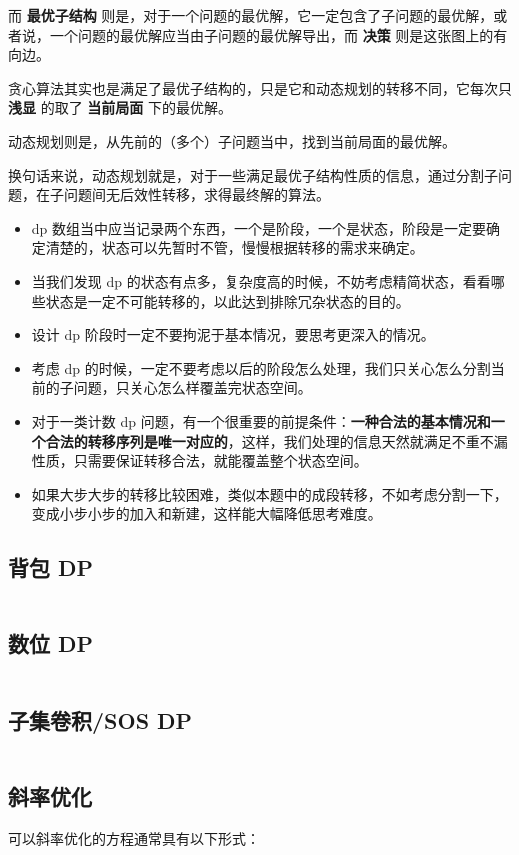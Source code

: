 \documentclass[titlepage, a4paper]{article}
\begin{document}
\begin{multicols}{2}
\begin{spacing}{0.6}
			 		而 \textbf{最优子结构} 则是，对于一个问题的最优解，它一定包含了子问题的最优解，或者说，一个问题的最优解应当由子问题的最优解导出，而 \textbf{决策} 则是这张图上的有向边。
			 		
			 		贪心算法其实也是满足了最优子结构的，只是它和动态规划的转移不同，它每次只 \textbf{浅显} 的取了 \textbf{当前局面} 下的最优解。
			 		
			 		动态规划则是，从先前的（多个）子问题当中，找到当前局面的最优解。
			 		
			 		换句话来说，动态规划就是，对于一些满足最优子结构性质的信息，通过分割子问题，在子问题间无后效性转移，求得最终解的算法。
			 		
			 		\begin{itemize}
			 			\item dp 数组当中应当记录两个东西，一个是阶段，一个是状态，阶段是一定要确定清楚的，状态可以先暂时不管，慢慢根据转移的需求来确定。
			 			\item 当我们发现 dp 的状态有点多，复杂度高的时候，不妨考虑精简状态，看看哪些状态是一定不可能转移的，以此达到排除冗杂状态的目的。
			 			\item 设计 dp 阶段时一定不要拘泥于基本情况，要思考更深入的情况。
			 			\item 考虑 dp 的时候，一定不要考虑以后的阶段怎么处理，我们只关心怎么分割当前的子问题，只关心怎么样覆盖完状态空间。
			 			\item 对于一类计数 dp 问题，有一个很重要的前提条件：\textbf{一种合法的基本情况和一个合法的转移序列是唯一对应的}，这样，我们处理的信息天然就满足不重不漏性质，只需要保证转移合法，就能覆盖整个状态空间。
			 			\item 如果大步大步的转移比较困难，类似本题中的成段转移，不如考虑分割一下，变成小步小步的加入和新建，这样能大幅降低思考难度。
			 		\end{itemize}
		 		\subsection{背包 DP}
		 			\inputminted{cpp}{src/Dp/Pack.cpp}
			 	\subsection{数位 DP}
			 		\inputminted{python}{src/Dp/Dight_dp.py}
			 	\subsection{子集卷积/SOS DP}
			 		\inputminted{cpp}{src/Dp/Sos_dp.cpp}
			 	\subsection{斜率优化}
			 		可以斜率优化的方程通常具有以下形式：
			 		

\end{spacing}
\end{multicols}
\end{document}
